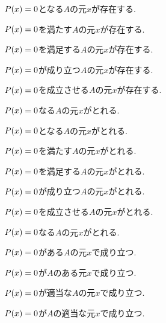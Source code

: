 \item $P(x)=0$となる$A$の元$x$が存在する.
\item $P(x)=0$を満たす$A$の元$x$が存在する.
\item $P(x)=0$を満足する$A$の元$x$が存在する.
\item $P(x)=0$が成り立つ$A$の元$x$が存在する.
\item $P(x)=0$を成立させる$A$の元$x$が存在する.
\item $P(x)=0$なる$A$の元$x$がとれる.
\item $P(x)=0$となる$A$の元$x$がとれる.
\item $P(x)=0$を満たす$A$の元$x$がとれる.
\item $P(x)=0$を満足する$A$の元$x$がとれる.
\item $P(x)=0$が成り立つ$A$の元$x$がとれる.
\item $P(x)=0$を成立させる$A$の元$x$がとれる.
\item $P(x)=0$なる$A$の元$x$がとれる.
\item $P(x)=0$がある$A$の元$x$で成り立つ.
\item $P(x)=0$が$A$のある元$x$で成り立つ.
\item $P(x)=0$が適当な$A$の元$x$で成り立つ.
\item $P(x)=0$が$A$の適当な元$x$で成り立つ.
